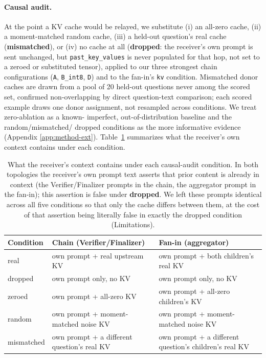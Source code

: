 \documentclass[11pt]{article}
\begin{document}
\paragraph{Causal audit.} At the point a KV cache would be relayed, we
substitute (i) an all-zero cache, (ii) a moment-matched random cache,
(iii) a held-out question's real cache (\textbf{mismatched}), or (iv)
no cache at all (\textbf{dropped}: the receiver's own prompt is sent
unchanged, but \texttt{past\_key\_values} is never populated for that
hop, not set to a zeroed or substituted tensor), applied to our three
strongest chain configurations (\texttt{A}, \texttt{B\_int8},
\texttt{D}) and to the fan-in's \texttt{kv} condition. Mismatched donor
caches are drawn from a pool of 20 held-out questions never among the
scored set, confirmed non-overlapping by direct question-text
comparison; each scored example draws one donor assignment, not
resampled across conditions. We treat zero-ablation as a known-
imperfect, out-of-distribution baseline and the random/mismatched/
dropped conditions as the more informative evidence (Appendix
\ref{app:method-ext}). Table~\ref{tab:conditions} summarizes what the
receiver's own context contains under each condition.

\begin{table}[t]
\centering
\small
\begin{tabular}{lp{3.5cm}p{3.1cm}}
\toprule
\textbf{Condition} & \textbf{Chain (Verifier/Finalizer)} & \textbf{Fan-in (aggregator)} \\
\midrule
real & own prompt + real upstream KV & own prompt + both children's real KV \\
dropped & own prompt only, no KV & own prompt only, no KV \\
zeroed & own prompt + all-zero KV & own prompt + all-zero children's KV \\
random & own prompt + moment-matched noise KV & own prompt + moment-matched noise KV \\
mismatched & own prompt + a different question's real KV & own prompt + a different question's children's real KV \\
\bottomrule
\end{tabular}
\caption{What the receiver's context contains under each causal-audit
condition. In both topologies the receiver's own prompt text asserts
that prior content is already in context (the Verifier/Finalizer
prompts in the chain, the aggregator prompt in the fan-in); this
assertion is false under \textbf{dropped}. We left these prompts
identical across all five conditions so that only the cache differs
between them, at the cost of that assertion being literally false in
exactly the dropped condition (Limitations).}
\label{tab:conditions}
\end{table}
\end{document}
